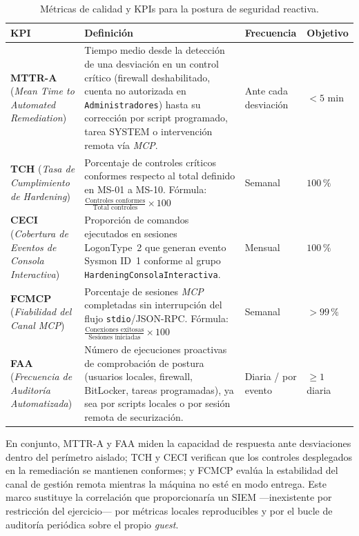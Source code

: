\begin{table}[htbp]
\centering
\setlength{\tabcolsep}{5pt}
\small
\begin{tabular}{|>{\raggedright\arraybackslash}p{}|>{\raggedright\arraybackslash}p{}|>{\raggedright\arraybackslash}p{}|>{\raggedright\arraybackslash}p{}|}
\hline
\textbf{KPI} & \textbf{Definición} & \textbf{Frecuencia} & \textbf{Objetivo} \\ \hline
\textbf{MTTR-A} \newline (\textit{Mean Time to Automated Remediation}) & Tiempo medio desde la detección de una desviación en un control crítico (firewall deshabilitado, cuenta no autorizada en \texttt{Administradores}) hasta su corrección por script programado, tarea SYSTEM o intervención remota vía \textit{MCP}. & Ante cada desviación & $< 5$ min \\ \hline
\textbf{TCH} \newline (\textit{Tasa de Cumplimiento de Hardening}) & Porcentaje de controles críticos conformes respecto al total definido en MS-01 a MS-10. \newline Fórmula: $\frac{\text{Controles conformes}}{\text{Total controles}} \times 100$ & Semanal & $100\,\%$ \\ \hline
\textbf{CECI} \newline (\textit{Cobertura de Eventos de Consola Interactiva}) & Proporción de comandos ejecutados en sesiones LogonType~2 que generan evento Sysmon ID~1 conforme al grupo \texttt{Hardening}\allowbreak\texttt{Consola}\allowbreak\texttt{Interactiva}. & Mensual & $100\,\%$ \\ \hline
\textbf{FCMCP} \newline (\textit{Fiabilidad del Canal MCP}) & Porcentaje de sesiones \textit{MCP} completadas sin interrupción del flujo \texttt{stdio}/JSON-RPC. \newline Fórmula: $\frac{\text{Conexiones exitosas}}{\text{Sesiones iniciadas}} \times 100$ & Semanal & $> 99\,\%$ \\ \hline
\textbf{FAA} \newline (\textit{Frecuencia de Auditoría Automatizada}) & Número de ejecuciones proactivas de comprobación de postura (usuarios locales, firewall, BitLocker, tareas programadas), ya sea por scripts locales o por sesión remota de securización. & Diaria / por evento & $\geq 1$ diaria \\ \hline
\end{tabular}
\caption{Métricas de calidad y KPIs para la postura de seguridad reactiva.}
\label{tab:kpis_seguridad}
\end{table}

En conjunto, MTTR-A y FAA miden la capacidad de respuesta ante desviaciones dentro del perímetro aislado; TCH y CECI verifican que los controles desplegados en la remediación se mantienen conformes; y FCMCP evalúa la estabilidad del canal de gestión remota mientras la máquina no esté en modo entrega. Este marco sustituye la correlación que proporcionaría un SIEM ---inexistente por restricción del ejercicio--- por métricas locales reproducibles y por el bucle de auditoría periódica sobre el propio \textit{guest}.

\endgroup
